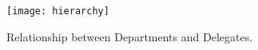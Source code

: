 \begin{figure}[ht!]
    \centering
    \texttt{[image: hierarchy]}
    \caption{Relationship between Departments and Delegates.}
    \label{fig:hierarchy}
\end{figure}